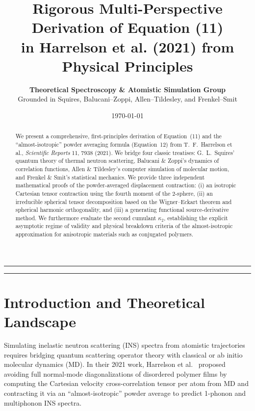 \documentclass[11pt,a4paper]{article}
\title{\textbf{Rigorous Multi-Perspective Derivation of Equation (11) \\ in Harrelson et al. (2021) from Physical Principles}}
\author{
    \textbf{Theoretical Spectroscopy \& Atomistic Simulation Group} \\
    \small Grounded in Squires, Balucani--Zoppi, Allen--Tildesley, and Frenkel--Smit
}
\date{\today}
\theoremstyle{definition}
\begin{document}
\maketitle

\begin{abstract}
We present a comprehensive, first-principles derivation of Equation~(11) and the ``almost-isotropic'' powder averaging formula (Equation~12) from T.~F.~Harrelson et al., \emph{Scientific Reports} 11, 7938 (2021). We bridge four classic treatises: G.~L.~Squires' quantum theory of thermal neutron scattering, Balucani \& Zoppi's dynamics of correlation functions, Allen \& Tildesley's computer simulation of molecular motion, and Frenkel \& Smit's statistical mechanics. We provide three independent mathematical proofs of the powder-averaged displacement contraction: (i) an isotropic Cartesian tensor contraction using the fourth moment of the 2-sphere, (ii) an irreducible spherical tensor decomposition based on the Wigner--Eckart theorem and spherical harmonic orthogonality, and (iii) a generating functional source-derivative method. We furthermore evaluate the second cumulant $\kappa_2$, establishing the explicit asymptotic regime of validity and physical breakdown criteria of the almost-isotropic approximation for anisotropic materials such as conjugated polymers.
\end{abstract}

\vspace{0.5em}
\hrule
\vspace{1.2em}

\tableofcontents

\vspace{1.5em}
\hrule
\vspace{1.5em}

\section{Introduction and Theoretical Landscape}

Simulating inelastic neutron scattering (INS) spectra from atomistic trajectories requires bridging quantum scattering operator theory with classical or ab initio molecular dynamics (MD). In their 2021 work, Harrelson et al.~\cite{harrelson2021} proposed avoiding full normal-mode diagonalizations of disordered polymer films by computing the Cartesian velocity cross-correlation tensor per atom from MD and contracting it via an ``almost-isotropic'' powder average to predict 1-phonon and multiphonon INS spectra.
\end{document}
